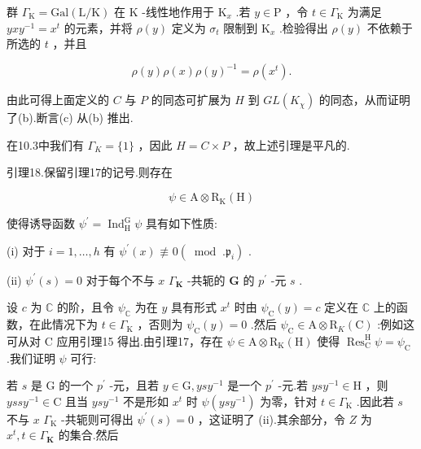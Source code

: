 \documentclass[10pt]{article}
\begin{document}
群 \({\Gamma }_{\mathrm{K}} = \mathrm{{Gal}}\left( {\mathrm{L}/\mathrm{K}}\right)\) 在 \(\mathrm{K}\) -线性地作用于 \({\mathrm{K}}_{x}\) .若 \(y \in  \mathrm{P}\) ，令 \(t \in  {\Gamma }_{\mathrm{K}}\) 为满足 \({yx}{y}^{-1} = {x}^{t}\) 的元素，并将 \(\rho \left( y\right)\) 定义为 \({\sigma }_{t}\) 限制到 \({\mathrm{K}}_{x}\) .检验得出 \(\rho \left( y\right)\) 不依赖于所选的 \(t\) ，并且

\[
\rho \left( y\right) \rho \left( x\right) \rho {\left( y\right) }^{-1} = \rho \left( {x}^{t}\right) .
\]

由此可得上面定义的 \(C\) 与 \(P\) 的同态可扩展为 \(H\) 到 \({GL}\left( {K}_{\chi }\right)\) 的同态，从而证明了(b).断言(c) 从(b) 推出.

在10.3中我们有 \({\Gamma }_{K} = \{ 1\}\) ，因此 \(H = C \times  P\) ，故上述引理是平凡的.

引理18.保留引理17的记号.则存在

\[
\psi  \in  \mathrm{A} \otimes  {\mathrm{R}}_{\mathrm{K}}\left( \mathrm{H}\right)
\]

使得诱导函数 \({\psi }^{\prime } = {\operatorname{Ind}}_{\mathrm{H}}^{\mathrm{G}}\psi\) 具有如下性质:

(i) 对于 \(i = 1,\ldots ,h\) 有 \({\psi }^{\prime }\left( x\right)  \text{ ≢ } 0\left( {\;\operatorname{mod}\;.{\mathfrak{p}}_{i}}\right)\) .

(ii) \({\psi }^{\prime }\left( s\right)  = 0\) 对于每个不与 \(x\)  \({\Gamma }_{\mathbf{K}}\) -共轭的 \(\mathbf{G}\) 的 \({p}^{\prime }\) -元 \(s\) .

设 \(c\) 为 \(\mathbb{C}\) 的阶，且令 \({\psi }_{\mathbb{C}}\) 为在 \(y\) 具有形式 \({x}^{t}\) 时由 \({\psi }_{\mathrm{C}}\left( y\right)  = c\) 定义在 \(\mathbb{C}\) 上的函数，在此情况下为 \(t \in  {\Gamma }_{\mathrm{K}}\) ，否则为 \({\psi }_{\mathrm{C}}\left( y\right)  = 0\) .然后 \({\psi }_{\mathrm{C}} \in  \mathrm{A} \otimes  {\mathrm{R}}_{K}\left( \mathrm{C}\right)\) :例如这可从对 \(\mathrm{C}\) 应用引理15 得出.由引理17，存在 \(\psi  \in  \mathrm{A} \otimes  {\mathrm{R}}_{\mathrm{K}}\left( \mathrm{H}\right)\) 使得 \({\operatorname{Res}}_{\mathrm{C}}^{\mathrm{H}}\psi  = {\psi }_{\mathrm{C}}\) .我们证明 \(\psi\) 可行:

若 \(s\) 是 \(\mathrm{G}\) 的一个 \({p}^{\prime }\) -元，且若 \(y \in  \mathrm{G},{ys}{y}^{-1}\) 是一个 \({p}^{\prime }\) -元.若 \({ys}{y}^{-1} \in  \mathrm{H}\) ，则 \({yss}{y}^{-1} \in  \mathrm{C}\) 且当 \({ys}{y}^{-1}\) 不是形如 \({x}^{t}\) 时 \(\psi \left( {{ys}{y}^{-1}}\right)\) 为零，针对 \(t \in  {\Gamma }_{\mathrm{K}}\) .因此若 \(s\) 不与 \(x\)  \({\Gamma }_{\mathrm{K}}\) -共轭则可得出 \({\psi }^{\prime }\left( s\right)  = 0\) ，这证明了 (ii).其余部分，令 \(Z\) 为 \({x}^{t},t \in  {\Gamma }_{\mathbf{K}}\) 的集合.然后
\end{document}

